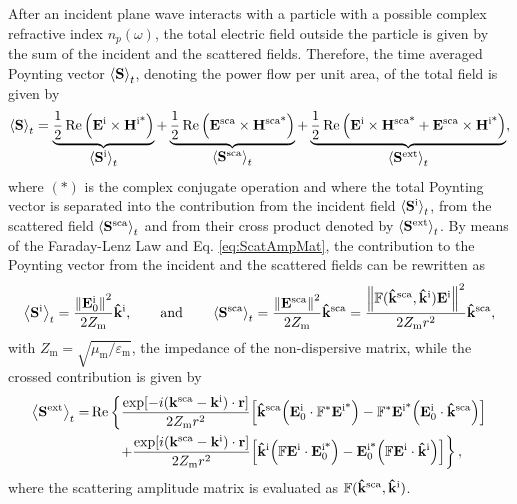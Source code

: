 After an incident plane wave interacts with a particle with a possible complex refractive index $n_p(\omega)$, the total electric field outside the particle is given by the sum of the incident and the scattered fields. Therefore, the time averaged Poynting vector $\ev{\vb{S}}_t$, denoting the power flow per unit area, of the total field is given by
%
 \begin{align}
	\ev{\vb{S}}_t
		= \underbrace{\frac12 \Re \qty(\vb{E}^\text{i}\times\vb{H}^\text{i*})}_{\text{\normalsize $\ev{\vb{S}^\text{i}}_t $}} +
		\underbrace{\frac12 \Re \qty(\vb{E}^\text{sca}\times\vb{H}^\text{sca*})}_{\text{\normalsize $\ev{\vb{S}^\text{sca}}_t $}}+
		\underbrace{	\frac12 \Re\qty(\vb{E}^\text{i}\times\vb{H}^\text{sca*} + \vb{E}^\text{sca}\times\vb{H}^\text{i*})}_{\text{\normalsize$\ev{\vb{S}^\text{ext}}_t$}},
 \label{eq:Stot}
 \end{align}
%
where $(*)$ is the complex conjugate operation and where the total Poynting vector is separated into the contribution from the incident field $\ev{\vb{S}^\text{i}}_t$, from the scattered field $\ev{\vb{S}^\text{sca}}_t$ and from their cross product denoted by $\ev{\vb{S}^\text{ext}}_t$. By means of the Faraday-Lenz Law and Eq. \eqref{eq:ScatAmpMat}, the  contribution to the Poynting vector from the incident and the scattered fields can be rewritten as
%
 \begin{equation}
	\ev{\vb{S}^\text{i}}_t = \frac{\norm{\vb{E}_0^\text{i}}^2}{2 Z_\text{m}}\vu{k}^\text{i},
		\qquad\text{and}\qquad
	\ev{\vb{S}^\text{sca}}_t = \frac{\norm{\vb{E}^\text{sca}}^2}{2 Z_\text{m}}\vu{k}^\text{sca}
						=  \frac{\norm{\mathbb{F}(\vu{k}^\text{sca},\vu{k}^\text{i})\vb{E}^\text{i}}^2}{2 Z_\text{m}r^2}\vu{k}^\text{sca},
 \label{eq:AvePoyntingISca}
 \end{equation}
%
with $Z_\text{m} = \sqrt{\mu_\text{m}/\varepsilon_\text{m}}$, the impedance of the non-dispersive matrix, while the crossed contribution is given by
%
 \begin{align}
 \ev{\vb{S}^\text{ext}}_t = &\Re\left\{
								\frac{\exp[-i(\vb{k}^\text{sca}-\vb{k}^\text{i})\cdot\vb{r}]}{2 Z_\text{m}r^2}
								\qty[\vu{k}^\text{sca}\qty(\vb{E}_0^\text{i}\cdot \mathbb{F}^*\vb{E}^\text{i*})
									-\mathbb{F}^*\vb{E}^\text{i*}	\qty(\vb{E}^\text{i}_0\cdot\vu{k}^\text{sca})]
							 \right.\notag	\\
							&\hspace{2em}\left.
								+\frac{\exp[i(\vb{k}^\text{sca}-\vb{k}^\text{i})\cdot\vb{r}]}{2 Z_\text{m}r^2}
								\qty[\vu{k}^\text{i}\qty(\mathbb{F}\vb{E}^\text{i}\cdot\vb{E}^\text{i*}_0)
									-\vb{E}^\text{i*}_0 \qty(\mathbb{F}\vb{E}^\text{i}\cdot\vu{k}^\text{i})]	\right\},
 \label{eq:AvePoyntingExt}
 \end{align}
%
where the scattering amplitude matrix is evaluated as $\mathbb{F}(\vu{k}^\text{sca},\vu{k}^\text{i})$.

